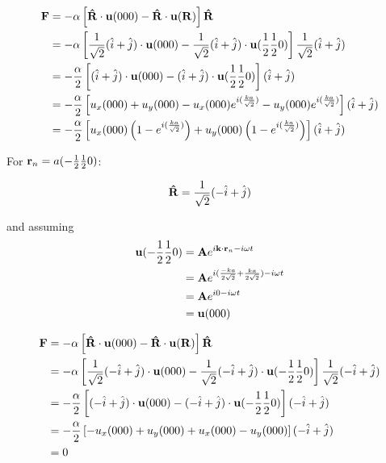 \documentclass{article}
\begin{document}
\begin{align}
  \mathbf{F} &= - \alpha \left[ \mathbf{\hat{R}}\cdot \mathbf{u}(000) -
  \mathbf{\hat{R}}\cdot
  \mathbf{u}(\mathbf{R})\right]\mathbf{\hat{R}}\\
  &=- \alpha \left[ {1\over \sqrt{2}} (\hat{i} + \hat{j}) \cdot
    \mathbf{u}(000) - {1\over \sqrt{2}} (\hat{i} + \hat{j}) \cdot
    \mathbf{u}({1\over 2}{1\over 2}0)\right]{1\over \sqrt{2}}(\hat{i}
    + \hat{j})\\
  &=- {\alpha\over 2} \left[ (\hat{i} + \hat{j}) \cdot
    \mathbf{u}(000) - (\hat{i} + \hat{j}) \cdot
    \mathbf{u}({1\over 2}{1\over 2}0)\right](\hat{i}
    + \hat{j})\\
  &=- {\alpha\over 2} \left[u_x(000) + u_y(000) - u_x(000) e^{i ({k
    a\over \sqrt{2}} )} - u_y(000)e^{i ({k a\over \sqrt{2}} )} \right](\hat{i}
    + \hat{j}) \\
  &=- {\alpha\over 2} \left[ u_x(000)\left( 1 - e^{i ({k
    a\over \sqrt{2}} )} \right) + u_y(000)\left(1- e^{i ({k a\over \sqrt{2}} )}\right) \right](\hat{i}
    + \hat{j}) \label{eq:F1}\\
\end{align}



For $\mathbf{r}_n = a(-{1\over
  2}{1\over 2}0)$:

\begin{equation}
  \mathbf{\hat{R}} = {1\over \sqrt{2}} (-\hat{i} + \hat{j})
  \end{equation}

and  assuming
\begin{align}
  \mathbf{u}(-{1\over  2}{1\over 2}0) &= \mathbf{A}e^{i \mathbf{k} \cdot \mathbf{r}_n - i \omega t}\\
  &= \mathbf{A}e^{i ({-k a\over 2 \sqrt{2}} +{k a\over 2 \sqrt{2}} ) - i \omega t}\\
  &= \mathbf{A}e^{i 0 - i \omega t}\\
  &= \mathbf{u}(000) \\
  \end{align}

\begin{align}
  \mathbf{F} &= - \alpha \left[ \mathbf{\hat{R}}\cdot \mathbf{u}(000) -
  \mathbf{\hat{R}}\cdot
  \mathbf{u}(\mathbf{R})\right]\mathbf{\hat{R}}\\
  &=- \alpha \left[ {1\over \sqrt{2}} (-\hat{i} + \hat{j}) \cdot
    \mathbf{u}(000) - {1\over \sqrt{2}} (-\hat{i} + \hat{j}) \cdot
    \mathbf{u}(-{1\over 2}{1\over 2}0)\right]{1\over \sqrt{2}}(-\hat{i}
    + \hat{j})\\
  &=- {\alpha\over 2} \left[ (-\hat{i} + \hat{j}) \cdot
    \mathbf{u}(000) - (-\hat{i} + \hat{j}) \cdot
    \mathbf{u}(-{1\over 2}{1\over 2}0)\right](-\hat{i}
    + \hat{j})\\
  &=- {\alpha\over 2} \left[-u_x(000) + u_y(000) + u_x(000) - u_y(000) \right](-\hat{i}
    + \hat{j}) \label{eq:F2}\\
  &= 0
\end{align}
\end{document}
